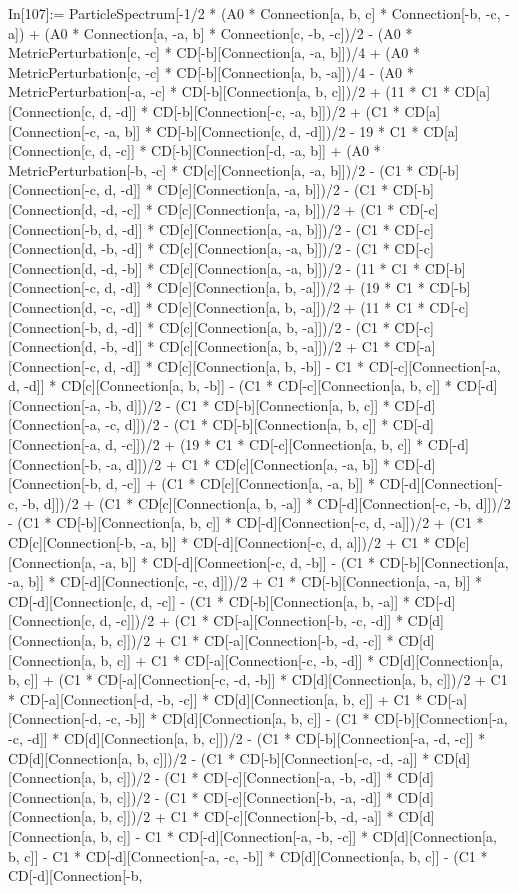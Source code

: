 In[107]:= ParticleSpectrum[-1/2 * (A0 * Connection[a, b, c] * Connection[-b, -c, -a]) + (A0 * Connection[a, -a, b] * Connection[c, -b, -c])/2 - (A0 * MetricPerturbation[c, -c] * CD[-b][Connection[a, -a, b]])/4 + (A0 * MetricPerturbation[c, -c] * CD[-b][Connection[a, b, -a]])/4 - (A0 * MetricPerturbation[-a, -c] * CD[-b][Connection[a, b, c]])/2 + (11 * C1 * CD[a][Connection[c, d, -d]] * CD[-b][Connection[-c, -a, b]])/2 + (C1 * CD[a][Connection[-c, -a, b]] * CD[-b][Connection[c, d, -d]])/2 - 19 * C1 * CD[a][Connection[c, d, -c]] * CD[-b][Connection[-d, -a, b]] + (A0 * MetricPerturbation[-b, -c] * CD[c][Connection[a, -a, b]])/2 - (C1 * CD[-b][Connection[-c, d, -d]] * CD[c][Connection[a, -a, b]])/2 - (C1 * CD[-b][Connection[d, -d, -c]] * CD[c][Connection[a, -a, b]])/2 + (C1 * CD[-c][Connection[-b, d, -d]] * CD[c][Connection[a, -a, b]])/2 - (C1 * CD[-c][Connection[d, -b, -d]] * CD[c][Connection[a, -a, b]])/2 - (C1 * CD[-c][Connection[d, -d, -b]] * CD[c][Connection[a, -a, b]])/2 - (11 * C1 * CD[-b][Connection[-c, d, -d]] * CD[c][Connection[a, b, -a]])/2 + (19 * C1 * CD[-b][Connection[d, -c, -d]] * CD[c][Connection[a, b, -a]])/2 + (11 * C1 * CD[-c][Connection[-b, d, -d]] * CD[c][Connection[a, b, -a]])/2 - (C1 * CD[-c][Connection[d, -b, -d]] * CD[c][Connection[a, b, -a]])/2 + C1 * CD[-a][Connection[-c, d, -d]] * CD[c][Connection[a, b, -b]] - C1 * CD[-c][Connection[-a, d, -d]] * CD[c][Connection[a, b, -b]] - (C1 * CD[-c][Connection[a, b, c]] * CD[-d][Connection[-a, -b, d]])/2 - (C1 * CD[-b][Connection[a, b, c]] * CD[-d][Connection[-a, -c, d]])/2 - (C1 * CD[-b][Connection[a, b, c]] * CD[-d][Connection[-a, d, -c]])/2 + (19 * C1 * CD[-c][Connection[a, b, c]] * CD[-d][Connection[-b, -a, d]])/2 + C1 * CD[c][Connection[a, -a, b]] * CD[-d][Connection[-b, d, -c]] + (C1 * CD[c][Connection[a, -a, b]] * CD[-d][Connection[-c, -b, d]])/2 + (C1 * CD[c][Connection[a, b, -a]] * CD[-d][Connection[-c, -b, d]])/2 - (C1 * CD[-b][Connection[a, b, c]] * CD[-d][Connection[-c, d, -a]])/2 + (C1 * CD[c][Connection[-b, -a, b]] * CD[-d][Connection[-c, d, a]])/2 + C1 * CD[c][Connection[a, -a, b]] * CD[-d][Connection[-c, d, -b]] - (C1 * CD[-b][Connection[a, -a, b]] * CD[-d][Connection[c, -c, d]])/2 + C1 * CD[-b][Connection[a, -a, b]] * CD[-d][Connection[c, d, -c]] - (C1 * CD[-b][Connection[a, b, -a]] * CD[-d][Connection[c, d, -c]])/2 + (C1 * CD[-a][Connection[-b, -c, -d]] * CD[d][Connection[a, b, c]])/2 + C1 * CD[-a][Connection[-b, -d, -c]] * CD[d][Connection[a, b, c]] + C1 * CD[-a][Connection[-c, -b, -d]] * CD[d][Connection[a, b, c]] + (C1 * CD[-a][Connection[-c, -d, -b]] * CD[d][Connection[a, b, c]])/2 + C1 * CD[-a][Connection[-d, -b, -c]] * CD[d][Connection[a, b, c]] + C1 * CD[-a][Connection[-d, -c, -b]] * CD[d][Connection[a, b, c]] - (C1 * CD[-b][Connection[-a, -c, -d]] * CD[d][Connection[a, b, c]])/2 - (C1 * CD[-b][Connection[-a, -d, -c]] * CD[d][Connection[a, b, c]])/2 - (C1 * CD[-b][Connection[-c, -d, -a]] * CD[d][Connection[a, b, c]])/2 - (C1 * CD[-c][Connection[-a, -b, -d]] * CD[d][Connection[a, b, c]])/2 - (C1 * CD[-c][Connection[-b, -a, -d]] * CD[d][Connection[a, b, c]])/2 + C1 * CD[-c][Connection[-b, -d, -a]] * CD[d][Connection[a, b, c]] - C1 * CD[-d][Connection[-a, -b, -c]] * CD[d][Connection[a, b, c]] - C1 * CD[-d][Connection[-a, -c, -b]] * CD[d][Connection[a, b, c]] - (C1 * CD[-d][Connection[-b, 